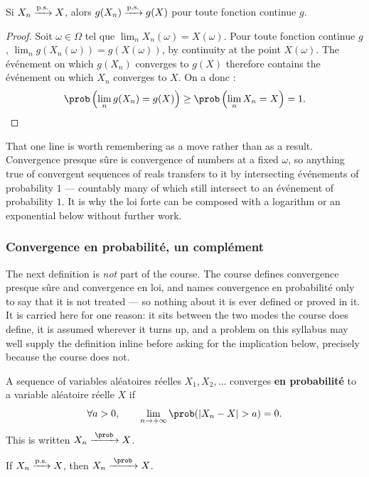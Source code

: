 \begin{prop}
  Si $X_{n} \xrightarrow{\text{p.s.}} X$, alors $g(X_{n}) \xrightarrow{\text{p.s.}} g(X)$ pour toute fonction
  continue $g$.
\end{prop}

\begin{proof}
  Soit $\omega \in \Omega$ tel que $\lim_{n} X_{n}(\omega) = X(\omega)$. Pour
  toute fonction continue $g$,
  $\lim_{n} g(X_{n}(\omega)) = g(X(\omega))$, by continuity at the point
  $X(\omega)$. The événement on which $g(X_{n})$ converges to $g(X)$ therefore
  contains the événement on which $X_{n}$ converges to $X$. On a donc :
  \[
    \prob\left(\lim_{n} g(X_{n}) = g(X)\right)
      \geq \prob\left(\lim_{n} X_{n} = X\right) = 1 .
  \]
\end{proof}

That one line is worth remembering as a move rather than as a result.
Convergence presque sûre is convergence of numbers at a fixed $\omega$, so
anything true of convergent sequences of reals transfers to it by intersecting
événements of probability $1$ --- countably many of which still intersect to an
événement of probability $1$. It is why the loi forte can be composed with a
logarithm or an exponential below without further work.

\subsubsection{Convergence en probabilité, un complément}
The next definition is \emph{not} part of the course. The course defines
convergence presque sûre and convergence en loi, and names convergence en
probabilité only to say that it is not treated --- so nothing about it is ever
defined or proved in it. It is carried here for one reason: it sits between
the two modes the course does define, it is assumed wherever it turns up, and a
problem on this syllabus may well supply the definition inline before asking
for the implication below, precisely because the course does not.

\begin{definition}
  A sequence of variables aléatoires réelles $X_{1}, X_{2}, \dots$ converges
  \textbf{en probabilité} to a variable aléatoire réelle
  $X$ if
  \[
    \forall a > 0, \qquad \lim_{n \to +\infty} \prob(|X_{n} - X| > a) = 0 .
  \]
  This is written $X_{n} \cvP X$.
\end{definition}

\begin{prop}
  If $X_{n} \xrightarrow{\text{p.s.}} X$, then $X_{n} \cvP X$.
\end{prop}


